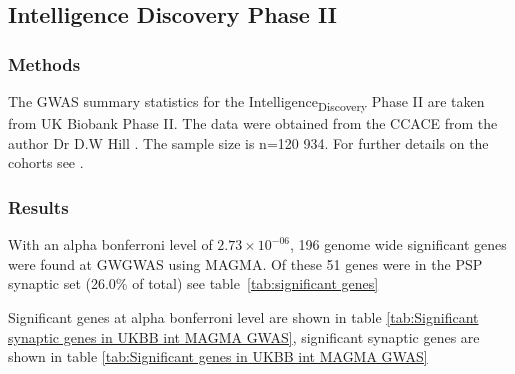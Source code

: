\subsection{Intelligence Discovery Phase II}



\subsubsection{Methods}
The GWAS summary statistics for the Intelligence\textsubscript{Discovery} Phase II are taken from UK Biobank Phase II. The data were obtained from the CCACE  from the author Dr D.W Hill  . The sample size is n=120 934. For further details on the cohorts see \cite{hill2019combined}.


\subsubsection{Results}
With an alpha bonferroni level of  $2.73\times 10^{-06}$, 196 genome wide significant genes were found at GWGWAS using MAGMA. Of these 51 genes were in the PSP synaptic set (26.0\% of total) see table~\ref{tab:significant genes}

Significant genes at alpha bonferroni level are shown in table \ref{tab:Significant synaptic genes in UKBB int  MAGMA GWAS}, significant synaptic genes are shown in table \ref{tab:Significant genes in UKBB int MAGMA GWAS}



